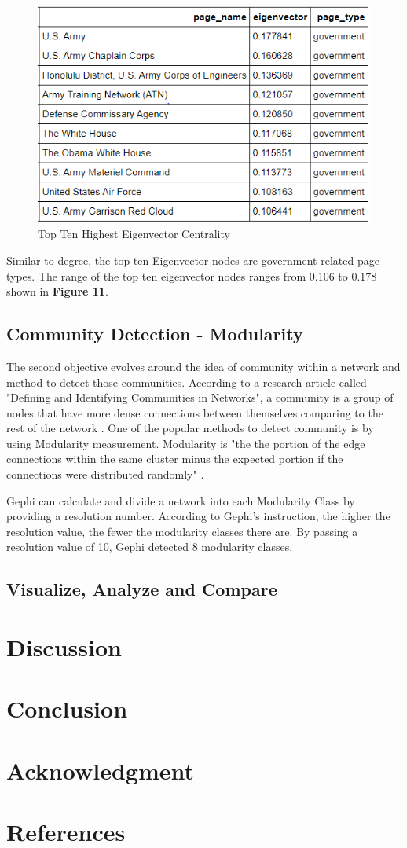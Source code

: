 \documentclass[11pt,twocolumn]{article}
\begin{document}
\begin{figure}[hbt!]
\includegraphics[scale=0.4]{top_ten_eigenvector.png} 
\caption{Top Ten Highest Eigenvector Centrality}
\end{figure}

Similar to degree, the top ten Eigenvector nodes are government related page types.  The range of the top ten eigenvector nodes ranges from 0.106 to 0.178 shown in \textbf{Figure 11}.

\subsection{Community Detection - Modularity}
The second objective evolves around the idea of community within a network and method to detect those communities. According to a research article called "Defining and Identifying Communities in Networks", a community is a group of nodes that have more dense connections  between themselves comparing to the rest of the network \cite{Radicchi2658}. One of the popular methods to detect community is by using Modularity measurement. Modularity is "the the portion of the edge connections within the same cluster minus the expected portion if the connections were distributed randomly" \cite{li_modular}.

Gephi can calculate and divide a network into each Modularity Class by providing a resolution number. According to Gephi's instruction, the higher the resolution value, the fewer the modularity classes there are. By passing a resolution value of 10, Gephi detected 8 modularity classes. 


\subsection{Visualize, Analyze and Compare}


\section{Discussion}


\section{Conclusion}


\section{Acknowledgment}
\section{References}
 

\end{document}
